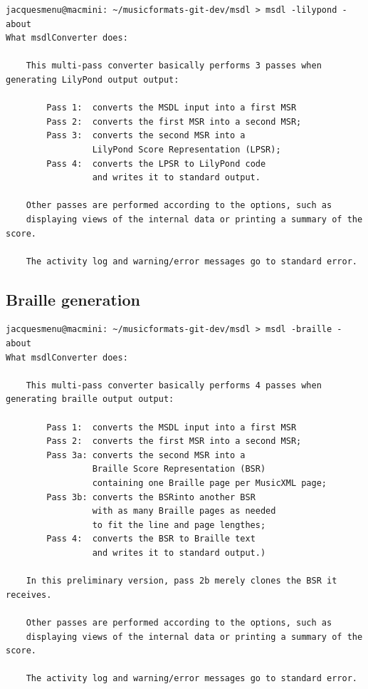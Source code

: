 \begin{lstlisting}[language=Terminal]
jacquesmenu@macmini: ~/musicformats-git-dev/msdl > msdl -lilypond -about
What msdlConverter does:

    This multi-pass converter basically performs 3 passes when generating LilyPond output output:

        Pass 1:  converts the MSDL input into a first MSR
        Pass 2:  converts the first MSR into a second MSR;
        Pass 3:  converts the second MSR into a
                 LilyPond Score Representation (LPSR);
        Pass 4:  converts the LPSR to LilyPond code
                 and writes it to standard output.

    Other passes are performed according to the options, such as
    displaying views of the internal data or printing a summary of the score.

    The activity log and warning/error messages go to standard error.
\end{lstlisting}

\subsection{Braille generation}

\begin{lstlisting}[language=Terminal]
jacquesmenu@macmini: ~/musicformats-git-dev/msdl > msdl -braille -about
What msdlConverter does:

    This multi-pass converter basically performs 4 passes when generating braille output output:

        Pass 1:  converts the MSDL input into a first MSR
        Pass 2:  converts the first MSR into a second MSR;
        Pass 3a: converts the second MSR into a
                 Braille Score Representation (BSR)
                 containing one Braille page per MusicXML page;
        Pass 3b: converts the BSRinto another BSR
                 with as many Braille pages as needed
                 to fit the line and page lengthes;
        Pass 4:  converts the BSR to Braille text
                 and writes it to standard output.)

    In this preliminary version, pass 2b merely clones the BSR it receives.

    Other passes are performed according to the options, such as
    displaying views of the internal data or printing a summary of the score.

    The activity log and warning/error messages go to standard error.
\end{lstlisting}

